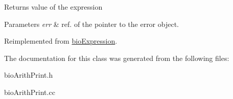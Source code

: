 \begin{DoxyReturn}{Returns}
value of the expression 
\end{DoxyReturn}

\begin{DoxyParams}{Parameters}
{\em err} & ref. of the pointer to the error object. \\
\hline
\end{DoxyParams}


Reimplemented from \hyperlink{classbio_expression_af58662a5d4d456f15bc4f2c9bd4f8a5b}{bio\+Expression}.



The documentation for this class was generated from the following files\+:\begin{DoxyCompactItemize}
\item 
bio\+Arith\+Print.\+h\item 
bio\+Arith\+Print.\+cc\end{DoxyCompactItemize}
